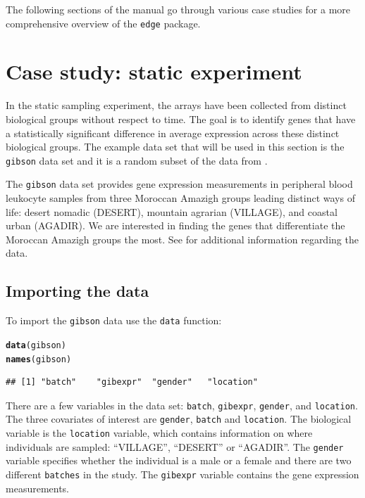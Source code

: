 \documentclass{article}\usepackage[]{graphicx}\usepackage[]{color}
\makeatletter
\newcommand{\hlstd}[1]{\textcolor[rgb]{0.345,0.345,0.345}{#1}}%
\newcommand{\hlkwd}[1]{\textcolor[rgb]{0.737,0.353,0.396}{\textbf{#1}}}%
\newenvironment{kframe}{%
 \def\at@end@of@kframe{}%
 \ifinner\ifhmode%
  \def\at@end@of@kframe{\end{minipage}}%
  \begin{minipage}{\columnwidth}%
 \fi\fi%
 \def\FrameCommand##1{\hskip\@totalleftmargin \hskip-\fboxsep
 \colorbox{shadecolor}{##1}\hskip-\fboxsep
     \hskip-\linewidth \hskip-\@totalleftmargin \hskip\columnwidth}%
 \MakeFramed {\advance\hsize-\width
   \@totalleftmargin\z@ \linewidth\hsize
   \@setminipage}}%
 {\par\unskip\endMakeFramed%
 \at@end@of@kframe}
\newenvironment{knitrout}{}{} %
\makeatother
\begin{document}
The following sections of the manual go through various case studies for a more comprehensive overview of the {\tt edge} package.

\section{Case study: static experiment}
\label{sec:gibson}
In the static sampling experiment, the arrays have been collected from distinct biological groups without respect to time. The goal is to identify genes that have a statistically significant difference in average expression across these distinct biological groups. The example data set that will be used in this section is the {\tt gibson} data set and it is a random subset of the data from \cite{gibson:2008}.

The {\tt gibson} data set provides gene expression measurements in peripheral blood leukocyte samples from three Moroccan Amazigh groups leading distinct ways of life: desert nomadic (DESERT), mountain agrarian (VILLAGE), and coastal urban (AGADIR). We are interested in finding the genes that differentiate the Moroccan Amazigh groups the most. See \cite{gibson:2008} for additional information regarding the data.

\subsection{Importing the data}
To import the {\tt gibson} data use the {\tt data} function:
\begin{knitrout}
\color{fgcolor}\begin{kframe}
\begin{alltt}
\hlkwd{data}\hlstd{(gibson)}
\hlkwd{names}\hlstd{(gibson)}
\end{alltt}
\begin{verbatim}
## [1] "batch"    "gibexpr"  "gender"   "location"
\end{verbatim}
\end{kframe}
\end{knitrout}
There are a few variables in the data set: {\tt batch}, {\tt gibexpr}, {\tt gender}, and {\tt location}. The three covariates of interest are {\tt gender}, {\tt batch} and {\tt location}. The biological variable is the {\tt location} variable, which contains information on where individuals are sampled: ``VILLAGE'', ``DESERT'' or ``AGADIR''. The {\tt gender} variable specifies whether the individual is a male or a female and there are two different {\tt batches} in the study. The {\tt gibexpr} variable contains the gene expression measurements. 
\end{document}
